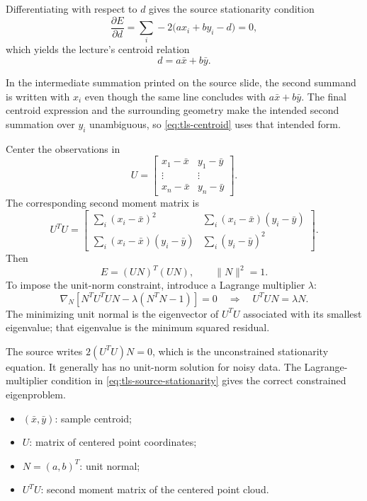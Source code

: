 \documentclass[11pt,a4paper,oneside]{report}
\newcommand{\mathlegend}[1]{%
  \par\vspace{0.2em}{\small\itshape where}\par
  \begin{itemize}[leftmargin=1.7em,topsep=0.15em,itemsep=0.12em]
  #1
  \end{itemize}
}
\begin{document}
Differentiating with respect to $d$ gives the source stationarity condition
\begin{equation}
  \frac{\partial E}{\partial d}
  =\sum_i -2\bigl(ax_i+by_i-d\bigr)=0,
  \label{eq:tls-d-derivative}
\end{equation}
which yields the lecture's centroid relation
\begin{equation}
  d=a\bar{x}+b\bar{y}.
  \label{eq:tls-centroid}
\end{equation}
\begin{warningbox}
In the intermediate summation printed on the source slide, the second summand is written with $x_i$ even though the same line concludes with $a\bar{x}+b\bar{y}$. The final centroid expression and the surrounding geometry make the intended second summation over $y_i$ unambiguous, so \cref{eq:tls-centroid} uses that intended form.
\end{warningbox}
Center the observations in
\[
U=\begin{bmatrix}
x_1-\bar{x}&y_1-\bar{y}\\
\vdots&\vdots\\
x_n-\bar{x}&y_n-\bar{y}
\end{bmatrix}.
\]
The corresponding second moment matrix is
\begin{equation}
U^TU=
\begin{bmatrix}
\sum_i(x_i-\bar{x})^2 & \sum_i(x_i-\bar{x})(y_i-\bar{y})\\
\sum_i(x_i-\bar{x})(y_i-\bar{y}) & \sum_i(y_i-\bar{y})^2
\end{bmatrix}.
\label{eq:tls-second-moment}
\end{equation}
Then
\begin{equation}
  E=(UN)^T(UN),\qquad \lVert N\rVert^2=1.
  \label{eq:tls-matrix}
\end{equation}
To impose the unit-norm constraint, introduce a Lagrange multiplier $\lambda$:
\begin{equation}
  \nabla_N\!\left[N^TU^TUN-\lambda(N^TN-1)\right]=0
  \quad\Longrightarrow\quad U^TU N=\lambda N.
  \label{eq:tls-source-stationarity}
\end{equation}
The minimizing unit normal is the eigenvector of $U^TU$ associated with its smallest eigenvalue; that eigenvalue is the minimum squared residual.
\begin{warningbox}
The source writes $2(U^TU)N=0$, which is the unconstrained stationarity equation. It generally has no unit-norm solution for noisy data. The Lagrange-multiplier condition in \cref{eq:tls-source-stationarity} gives the correct constrained eigenproblem.
\end{warningbox}
\mathlegend{
  \item $(\bar{x},\bar{y})$: sample centroid;
  \item $U$: matrix of centered point coordinates;
  \item $N=(a,b)^T$: unit normal;
  \item $U^TU$: second moment matrix of the centered point cloud.
}
\end{document}
